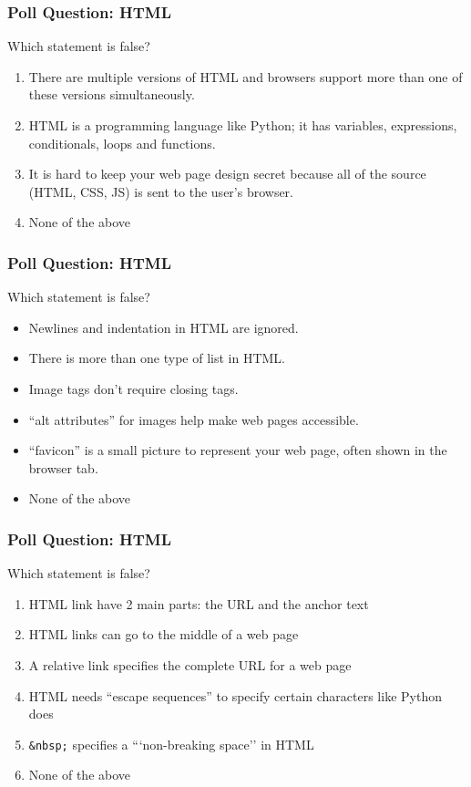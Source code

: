 \documentclass{beamer}
\begin{document}
%
%
\begin{frame}[fragile]
  \frametitle{Poll Question: HTML}
  Which statement is false?
  \begin{enumerate}[A]
    \item There are multiple versions of HTML and browsers support more than one of these versions simultaneously.
    \item HTML is a programming language like Python; it has variables, expressions, conditionals, loops and functions.
    \item It is hard to keep your web page design secret because all of the source (HTML, CSS, JS) is sent to the user's browser.
    \item None of the above
  \end{enumerate}
\end{frame}

%
%
\begin{frame}[fragile]
  \frametitle{Poll Question: HTML}
  Which statement is false?
  \begin{itemize}
    \item Newlines and indentation in HTML are ignored.
    \item There is more than one type of list in HTML.
    \item Image tags don't require closing tags.
    \item ``alt attributes'' for images help make web pages accessible.
    \item ``favicon'' is a small picture to represent your web page, often shown in the browser tab.
    \item None of the above
  \end{itemize}
\end{frame}

%
%
\begin{frame}[fragile]
  \frametitle{Poll Question: HTML}
  Which statement is false?
  \begin{enumerate}[A]
    \item HTML link have 2 main parts: the URL and the anchor text
    \item HTML links can go to the middle of a web page
    \item A relative link specifies the complete URL for a web page
    \item HTML needs ``escape sequences'' to specify certain characters like Python does
    \item \lstinline|&nbsp;| specifies a ```non-breaking space'' in HTML
    \item None of the above
  \end{enumerate}
\end{frame}
\end{document}
